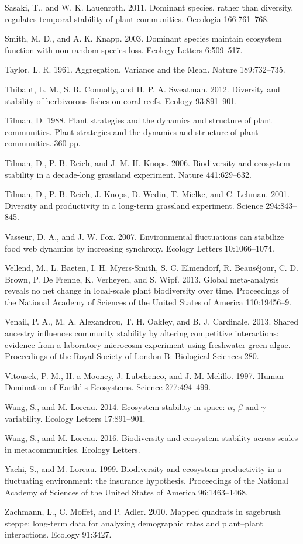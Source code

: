 \documentclass[11pt,]{article}
\begin{document}
Sasaki, T., and W. K. Lauenroth. 2011. Dominant species, rather than
diversity, regulates temporal stability of plant communities. Oecologia
166:761--768.

Smith, M. D., and A. K. Knapp. 2003. Dominant species maintain ecosystem
function with non-random species loss. Ecology Letters 6:509--517.

Taylor, L. R. 1961. Aggregation, Variance and the Mean. Nature
189:732--735.

Thibaut, L. M., S. R. Connolly, and H. P. A. Sweatman. 2012. Diversity
and stability of herbivorous fishes on coral reefs. Ecology 93:891--901.

Tilman, D. 1988. Plant strategies and the dynamics and structure of
plant communities. Plant strategies and the dynamics and structure of
plant communities.:360 pp.

Tilman, D., P. B. Reich, and J. M. H. Knops. 2006. Biodiversity and
ecosystem stability in a decade-long grassland experiment. Nature
441:629--632.

Tilman, D., P. B. Reich, J. Knops, D. Wedin, T. Mielke, and C. Lehman.
2001. Diversity and productivity in a long-term grassland experiment.
Science 294:843--845.

Vasseur, D. A., and J. W. Fox. 2007. Environmental fluctuations can
stabilize food web dynamics by increasing synchrony. Ecology Letters
10:1066--1074.

Vellend, M., L. Baeten, I. H. Myers-Smith, S. C. Elmendorf, R.
Beaus{é}jour, C. D. Brown, P. {De Frenne}, K. Verheyen, and S. Wipf.
2013. Global meta-analysis reveals no net change in local-scale plant
biodiversity over time. Proceedings of the National Academy of Sciences
of the United States of America 110:19456--9.

Venail, P. A., M. A. Alexandrou, T. H. Oakley, and B. J. Cardinale.
2013. Shared ancestry influences community stability by altering
competitive interactions: evidence from a laboratory microcosm
experiment using freshwater green algae. Proceedings of the Royal
Society of London B: Biological Sciences 280.

Vitousek, P. M., H. a Mooney, J. Lubchenco, and J. M. Melillo. 1997.
Human Domination of Earth' s Ecosystems. Science 277:494--499.

Wang, S., and M. Loreau. 2014. Ecosystem stability in space: \(\alpha\),
\(\beta\) and \(\gamma\) variability. Ecology Letters 17:891--901.

Wang, S., and M. Loreau. 2016. Biodiversity and ecosystem stability
across scales in metacommunities. Ecology Letters.

Yachi, S., and M. Loreau. 1999. Biodiversity and ecosystem productivity
in a fluctuating environment: the insurance hypothesis. Proceedings of
the National Academy of Sciences of the United States of America
96:1463--1468.

Zachmann, L., C. Moffet, and P. Adler. 2010. Mapped quadrats in
sagebrush steppe: long-term data for analyzing demographic rates and
plant--plant interactions. Ecology 91:3427.
\end{document}
